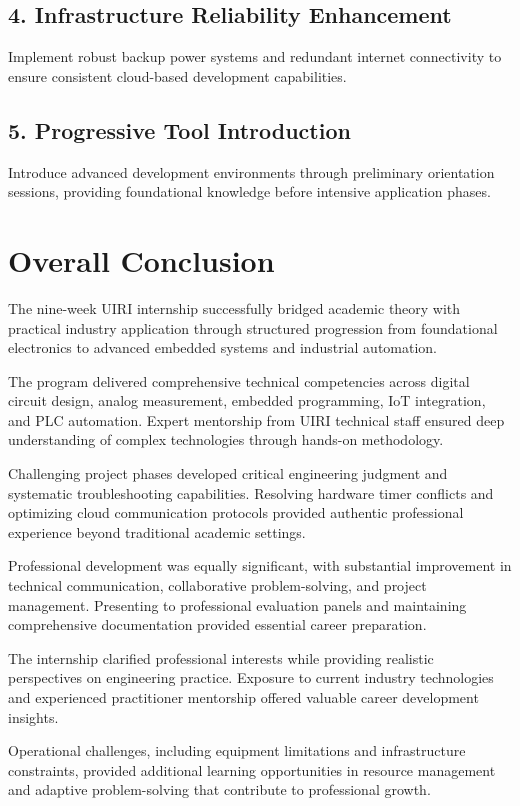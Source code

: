 \documentclass[12pt,a4paper]{report}
\begin{document}
\subsection*{4. Infrastructure Reliability Enhancement}
Implement robust backup power systems and redundant internet connectivity to ensure consistent cloud-based development capabilities.

\subsection*{5. Progressive Tool Introduction}
Introduce advanced development environments through preliminary orientation sessions, providing foundational knowledge before intensive application phases.

\section{Overall Conclusion}

The nine-week UIRI internship successfully bridged academic theory with practical industry application through structured progression from foundational electronics to advanced embedded systems and industrial automation.

The program delivered comprehensive technical competencies across digital circuit design, analog measurement, embedded programming, IoT integration, and PLC automation. Expert mentorship from UIRI technical staff ensured deep understanding of complex technologies through hands-on methodology.

Challenging project phases developed critical engineering judgment and systematic troubleshooting capabilities. Resolving hardware timer conflicts and optimizing cloud communication protocols provided authentic professional experience beyond traditional academic settings.

Professional development was equally significant, with substantial improvement in technical communication, collaborative problem-solving, and project management. Presenting to professional evaluation panels and maintaining comprehensive documentation provided essential career preparation.

The internship clarified professional interests while providing realistic perspectives on engineering practice. Exposure to current industry technologies and experienced practitioner mentorship offered valuable career development insights.

Operational challenges, including equipment limitations and infrastructure constraints, provided additional learning opportunities in resource management and adaptive problem-solving that contribute to professional growth.
\end{document}
